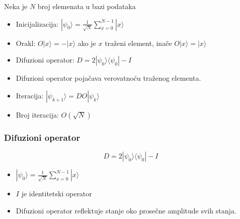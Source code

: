 \documentclass[aspectratio=169]{beamer}
\begin{document}
\begin{frame}
    Neka je $N$ broj elemenata u bazi podataka
    \begin{itemize}
        \item Inicijalizacija: $ |\psi_0\rangle = \frac{1}{\sqrt{N}} \sum_{x=0}^{N-1} |x\rangle $
        \item Orakl: $ O|x\rangle = -|x\rangle $ ako je $x$ traženi element, inače $O|x\rangle = |x\rangle $
        \item Difuzioni operator: $ D = 2|\psi_0\rangle \langle \psi_0| - I $
        \item Difuzioni operator pojačava verovatnoću traženog elementa.
        \item Iteracija: $ |\psi_{k+1}\rangle = D O |\psi_k\rangle $
        \item Broj iteracija: $ O(\sqrt{N}) $
    \end{itemize}
\end{frame}

\begin{frame}
    \frametitle{Difuzioni operator}

    $$ D = 2|\psi_0\rangle \langle \psi_0| - I $$

    \begin{itemize}
        \item $|\psi_0\rangle = \frac{1}{\sqrt{N}} \sum_{x=0}^{N-1} |x\rangle$
        \item $I$ je identitetski operator
        \item Difuzioni operator reflektuje stanje oko prosečne amplitude svih stanja.
    \end{itemize}

\end{frame}
\end{document}
